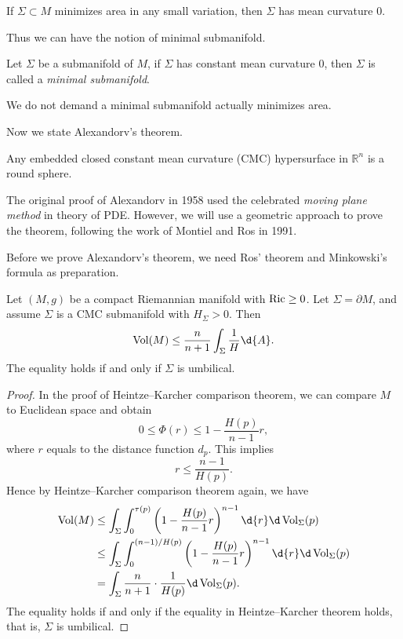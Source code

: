 \begin{cor}
    If $\Sigma\subset M$ minimizes area in any small variation, then $\Sigma$ has mean curvature $0$.
\end{cor}

Thus we can have the notion of minimal submanifold.
\begin{defn}
    Let $\Sigma$ be a submanifold of $M$, if $\Sigma$ has constant mean curvature $0$, then $\Sigma$ is called a \emph{minimal submanifold}.
\end{defn}

\begin{rem}
    We do not demand a minimal submanifold actually minimizes area.
\end{rem}

Now we state Alexandorv's theorem.
\begin{thm}[Alexandorv]
    Any embedded closed constant mean curvature (CMC) hypersurface in $\mathbb{R}^n$ is a round sphere.
\end{thm}

\begin{rem}
    The original proof of Alexandorv in 1958 used the celebrated \emph{moving plane method} in theory of PDE.
    However, we will use a geometric approach to prove the theorem, following the work of Montiel and Ros in 1991.
\end{rem}

Before we prove Alexandorv's theorem, we need Ros' theorem and Minkowski's formula as preparation.

\begin{thm}[Ros]
    Let $(M,g)$ be a compact Riemannian manifold with $\operatorname{Ric}\geq 0$.
    Let $\Sigma=\partial M$, and assume $\Sigma$ is a CMC submanifold with $H_\Sigma>0$.
    Then
    \[\Vol(M)\leq\frac{n}{n+1}\int_\Sigma\frac{1}{H}\d{A}.\]
    The equality holds if and only if $\Sigma$ is umbilical.
\end{thm}
\begin{proof}
    In the proof of Heintze--Karcher comparison theorem, we can compare $M$ to Euclidean space and obtain
    \[0\leq\Phi(r)\leq 1-\frac{H(p)}{n-1}r,\]
    where $r$ equals to the distance function $d_p$.
    This implies
    \[r\leq\frac{n-1}{H(p)}.\]
    Hence by Heintze--Karcher comparison theorem again, we have
    \begin{align*}
        \Vol(M)&\leq\int_\Sigma\int_0^{\tau(p)}\left(1-\frac{H(p)}{n-1}r\right)^{n-1}\d{r}\d\Vol_{\Sigma}(p)\\
        &\leq\int_\Sigma\int_{0}^{(n-1)/H(p)}\left(1-\frac{H(p)}{n-1}r\right)^{n-1}\d{r}\d\Vol_{\Sigma}(p)\\
        &=\int_\Sigma\frac{n}{n+1}\cdot\frac{1}{H(p)}\d\Vol_\Sigma(p).
    \end{align*}
    The equality holds if and only if the equality in Heintze--Karcher theorem holds, that is, $\Sigma$ is umbilical. 
\end{proof}

